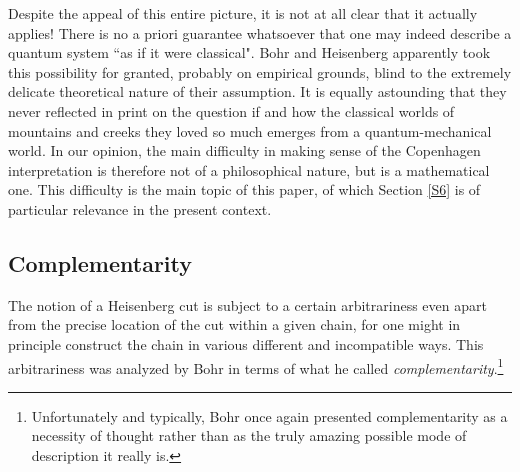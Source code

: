 \documentclass[12pt,titlepage]{article}
\begin{document}
Despite the appeal of this entire picture, it is not at all clear that it actually applies! There is no a priori guarantee whatsoever that one may indeed describe a quantum system ``as if it were classical".  Bohr and Heisenberg apparently took this possibility for granted, probably on empirical grounds, blind to  the extremely delicate theoretical nature of their assumption. It is equally astounding that they never reflected in print on the question if and how  the classical worlds of mountains and creeks they loved so much emerges from  a quantum-mechanical world. In our opinion, the main difficulty in making sense of the Copenhagen interpretation is therefore not of a philosophical nature, 
but is a mathematical one. This difficulty is the main topic of this paper, of which Section \ref{S6} is of particular relevance in the present context.
\subsection{Complementarity}\label{compl}
The notion of a Heisenberg cut is subject to a certain arbitrariness even apart from the precise location of the cut within a given chain, for one might in principle construct the chain in various different and incompatible ways. This arbitrariness was analyzed by Bohr in terms of what he called \textit{complementarity}.\footnote{Unfortunately and typically, Bohr 
once again presented complementarity as a necessity of thought rather than as the truly amazing  possible mode of description it really is.} 
\end{document}
